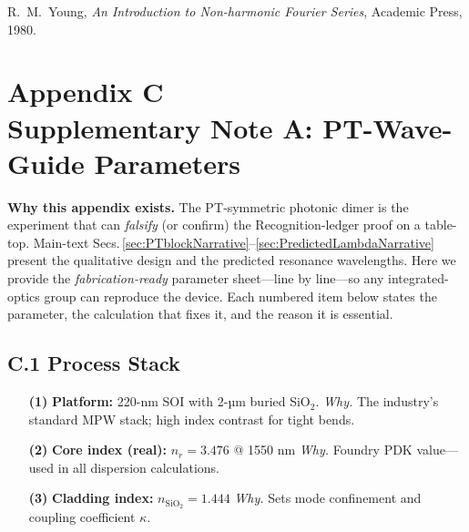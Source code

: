 \documentclass[11pt]{article}
\begin{document}
\begin{thebibliography}{9}\small
{}
R.~M.~Young,
\emph{An Introduction to Non-harmonic Fourier Series},
Academic Press, 1980.
\end{thebibliography}

\section*{Appendix C \\[2pt] Supplementary Note A: PT-Wave-Guide Parameters}
\label{app:PTParamsNarrative}

\noindent
\textbf{Why this appendix exists.}  
The PT‐symmetric photonic dimer is the experiment that can
\emph{falsify} (or confirm) the Recognition-ledger proof on a
table-top.  
Main-text Secs.\,\ref{sec:PTblockNarrative}–\ref{sec:PredictedLambdaNarrative}
present the qualitative design and the predicted resonance
wavelengths.  
Here we provide the \emph{fabrication-ready} parameter sheet—line by
line—so any integrated-optics group can reproduce the device.
Each numbered item below states the parameter, the calculation that
fixes it, and the reason it is essential.

\vspace{1em}
\subsection*{C.1  Process Stack}
\begin{enumerate}
\item[\textbf{(1)}] \textbf{Platform:} 220-nm SOI with 2-µm buried SiO$_2$.  
      \textit{Why.}  The industry’s standard MPW stack; high index contrast for tight bends.

\item[\textbf{(2)}] \textbf{Core index (real):} $n_r = 3.476$ @ 1550 nm  
      \textit{Why.}  Foundry PDK value—used in all dispersion calculations.

\item[\textbf{(3)}] \textbf{Cladding index:} $n_{\text{SiO}_2}=1.444$  
      \textit{Why.}  Sets mode confinement and coupling coefficient $\kappa$.
\end{enumerate}

\vspace{0.6em}
\end{document}
